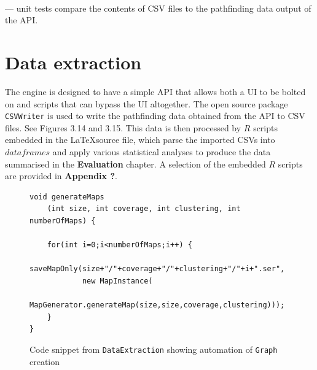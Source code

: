 \documentclass[12pt,notitlepage]{report}
\begin{document}
\\

 --- unit tests compare the contents of CSV files to the pathfinding data output of the API.

\section{Data extraction}

The engine is designed to have a simple API that allows both a UI to be bolted on and scripts that can bypass the UI altogether. The open source package {\tt CSVWriter} is used to write the pathfinding data obtained from the API to CSV files. See Figures 3.14 and 3.15. This data is then processed by $R$ scripts embedded in the \LaTeX source file, which parse the imported CSVs into $dataframes$ and apply various statistical analyses to produce the data summarised in the {\bf Evaluation} chapter. A selection of the embedded $R$ scripts are provided in {\bfseries Appendix ?}.

\begin{figure}
\begin{lstlisting}
void generateMaps 
	(int size, int coverage, int clustering, int numberOfMaps) {
	
	for(int i=0;i<numberOfMaps;i++) {
		saveMapOnly(size+"/"+coverage+"/"+clustering+"/"+i+".ser",
			new MapInstance(
				MapGenerator.generateMap(size,size,coverage,clustering)));
	}
}
\end{lstlisting}
\caption{Code snippet from {\tt DataExtraction} showing automation of {\tt Graph} creation}
\end{figure}
\end{document}
